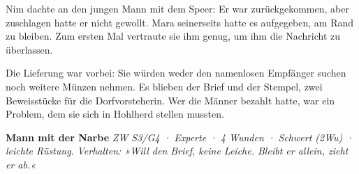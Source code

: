 \documentclass[10pt,a4paper]{article}
\begin{document}
Nim dachte an den jungen Mann mit dem Speer: Er war zurückgekommen, aber zuschlagen hatte er nicht gewollt. Mara seinerseits hatte es aufgegeben, am Rand zu bleiben. Zum ersten Mal vertraute sie ihm genug, um ihm die Nachricht zu überlassen.

Die Lieferung war vorbei: Sie würden weder den namenlosen Empfänger suchen noch weitere Münzen nehmen. Es blieben der Brief und der Stempel, zwei Beweisstücke für die Dorfvorsteherin. Wer die Männer bezahlt hatte, war ein Problem, dem sie sich in Hohlherd stellen mussten.
\begin{rpgnote}[fontupper=\normalfont]\textbf{Mann mit der Narbe} \emph{ZW S3/G4 · Experte · 4 Wunden · Schwert (2Wu) · leichte Rüstung.} \emph{Verhalten: »Will den Brief, keine Leiche. Bleibt er allein, zieht er ab.«}\end{rpgnote}
\end{document}
